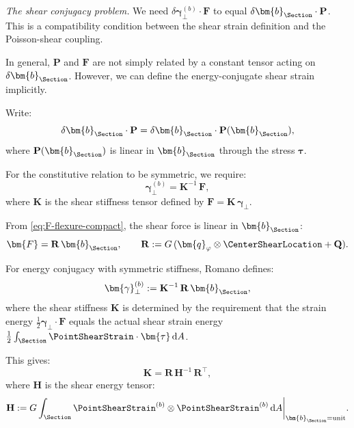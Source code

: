 \emph{The shear conjugacy problem.} We need $\delta\bm{\gamma}_\perp^{(b)} \cdot \bm{F}$ 
to equal $\delta\bm{b}_{\Section} \cdot \mathbf{P}$. 
This is a compatibility condition 
between the shear strain definition and the Poisson-shear coupling.

In general, $\mathbf{P}$ and $\bm{F}$ are not simply related by a constant tensor 
acting on $\delta\bm{b}_{\Section}$. However, we can define the energy-conjugate shear 
strain implicitly.

Write:
\begin{equation}
\delta\bm{b}_{\Section} \cdot \mathbf{P} = \delta\bm{b}_{\Section} \cdot \mathbf{P}(\bm{b}_{\Section}),
\end{equation}
where $\mathbf{P}(\bm{b}_{\Section})$ is linear in $\bm{b}_{\Section}$ through the stress $\bm{\tau}$.

For the constitutive relation to be symmetric, we require:
\begin{equation}
\bm{\gamma}_\perp^{(b)} = \mathbf{K}^{-1}\,\bm{F},
\label{eq:romano-shear-def}
\end{equation}
where $\mathbf{K}$ is the shear stiffness tensor defined by $\bm{F} = \mathbf{K}\,\bm{\gamma}_\perp$.

From \eqref{eq:F-flexure-compact}, the shear force is linear in $\bm{b}_{\Section}$:
\begin{equation}
\bm{F} = \mathbf{R}\,\bm{b}_{\Section}, \qquad 
\mathbf{R} := G\,(\bm{q}_\varphi \otimes \CenterShearLocation + \mathbf{Q}).
\label{eq:F-R-relation}
\end{equation}

For energy conjugacy with symmetric stiffness, Romano defines:
\begin{equation}
\bm{\gamma}_\perp^{(b)} := \mathbf{K}^{-1}\,\mathbf{R}\,\bm{b}_{\Section},
\label{eq:ec-shear-final}
\end{equation}
where the shear stiffness $\mathbf{K}$ is determined by the requirement that 
the strain energy $\frac{1}{2}\bm{\gamma}_\perp \cdot \bm{F}$ equals the actual 
shear strain energy $\frac{1}{2}\int_\Section \PointShearStrain \cdot \bm{\tau} \, \mathrm{d}A$.

This gives:
\begin{equation}
\mathbf{K} = \mathbf{R}\,\mathbf{H}^{-1}\,\mathbf{R}^\top,
\label{eq:K-formula}
\end{equation}
where $\mathbf{H}$ is the shear energy tensor:
\begin{equation}
\mathbf{H} := G \int_\Section \PointShearStrain^{(b)} \otimes \PointShearStrain^{(b)} \, \mathrm{d}A 
\bigg|_{\bm{b}_{\Section} = \text{unit}}.
\label{eq:def-H}
\end{equation}

